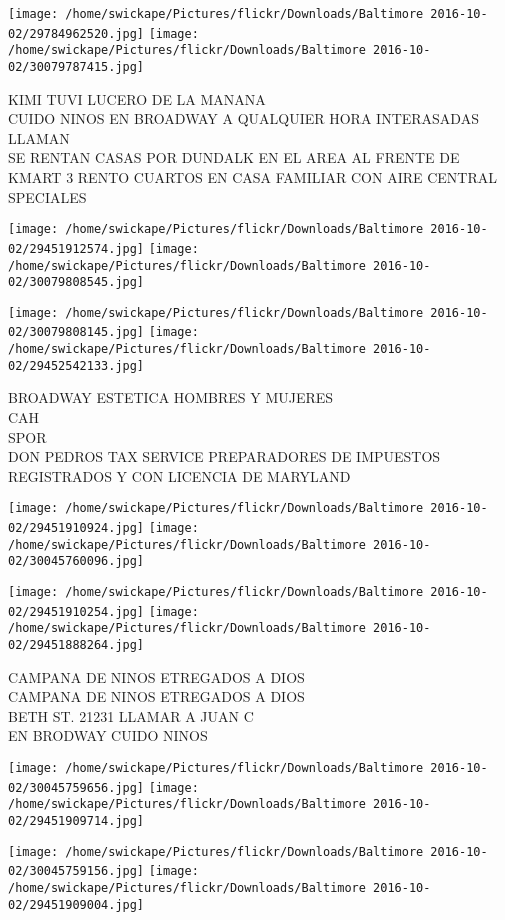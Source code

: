\documentclass[10pt,letterpaper]{article}
\begin{document}
\texttt{[image: /home/swickape/Pictures/flickr/Downloads/Baltimore 2016-10-02/29784962520.jpg]}
\texttt{[image: /home/swickape/Pictures/flickr/Downloads/Baltimore 2016-10-02/30079787415.jpg]}

KIMI TUVI LUCERO DE LA MANANA\\
CUIDO NINOS EN BROADWAY A QUALQUIER HORA INTERASADAS LLAMAN\\
SE RENTAN CASAS POR DUNDALK EN EL AREA AL FRENTE DE KMART 3 RENTO CUARTOS EN CASA FAMILIAR CON AIRE CENTRAL\\
SPECIALES
\pagebreak

\texttt{[image: /home/swickape/Pictures/flickr/Downloads/Baltimore 2016-10-02/29451912574.jpg]}
\texttt{[image: /home/swickape/Pictures/flickr/Downloads/Baltimore 2016-10-02/30079808545.jpg]}

\texttt{[image: /home/swickape/Pictures/flickr/Downloads/Baltimore 2016-10-02/30079808145.jpg]}
\texttt{[image: /home/swickape/Pictures/flickr/Downloads/Baltimore 2016-10-02/29452542133.jpg]}

BROADWAY ESTETICA HOMBRES Y MUJERES\\
CAH\\
SPOR\\
DON PEDROS TAX SERVICE PREPARADORES DE IMPUESTOS REGISTRADOS Y CON LICENCIA DE MARYLAND
\pagebreak

\texttt{[image: /home/swickape/Pictures/flickr/Downloads/Baltimore 2016-10-02/29451910924.jpg]}
\texttt{[image: /home/swickape/Pictures/flickr/Downloads/Baltimore 2016-10-02/30045760096.jpg]}

\texttt{[image: /home/swickape/Pictures/flickr/Downloads/Baltimore 2016-10-02/29451910254.jpg]}
\texttt{[image: /home/swickape/Pictures/flickr/Downloads/Baltimore 2016-10-02/29451888264.jpg]}

CAMPANA DE NINOS ETREGADOS A DIOS\\
CAMPANA DE NINOS ETREGADOS A DIOS\\
BETH ST. 21231 LLAMAR A JUAN C\\
EN BRODWAY CUIDO NINOS
\pagebreak

\texttt{[image: /home/swickape/Pictures/flickr/Downloads/Baltimore 2016-10-02/30045759656.jpg]}
\texttt{[image: /home/swickape/Pictures/flickr/Downloads/Baltimore 2016-10-02/29451909714.jpg]}

\texttt{[image: /home/swickape/Pictures/flickr/Downloads/Baltimore 2016-10-02/30045759156.jpg]}
\texttt{[image: /home/swickape/Pictures/flickr/Downloads/Baltimore 2016-10-02/29451909004.jpg]}
\end{document}
